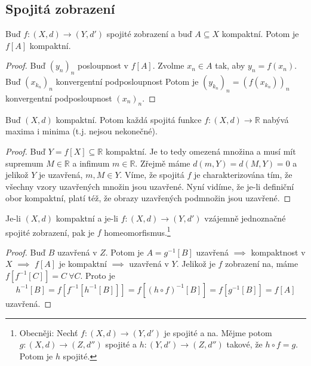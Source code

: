 \documentclass[../main.tex]{subfiles}
\begin{document}
\subsection{Spojitá zobrazení}

\begin{lemma}
	Buď $f: (X,d) \to (Y, d')$ spojité zobrazení a buď $A \subseteq X$ kompaktní. Potom je $f[A]$ kompaktní.
\end{lemma}

\begin{proof}
	Buď $(y_n)_n$ posloupnost v $f[A]$. Zvolme $x_n \in A$ tak, aby $y_n = f(x_n)$. Buď $(x_{k_n})_n$ konvergentní podposloupnost
	Potom je $(y_{k_n})_n = (f(x_{k_n}))_n$ konvergentní podposloupnost $(x_n)_n$.
\end{proof}

\begin{lemma}
	Buď $(X,d)$ kompaktní. Potom každá spojitá funkce $f:(X,d)\to \mathbb{R}$ nabývá maxima i minima (t.j. nejsou nekonečné).
\end{lemma}

\begin{proof}
	Buď $Y = f[X] \subseteq \mathbb{R}$ kompaktní. Je to tedy omezená množina a musí mít supremum $M\in \mathbb{R}$ a infimum $m\in \mathbb{R}$. Zřejmě máme 
	$d(m,Y) = d(M,Y) = 0$ a jelikož $Y$ je uzavřená, $m,M \in Y$. Víme, že spojitá $f$ je charakterizována tím, že všechny vzory uzavřených množin
	jsou uzavřené. Nyní vidíme, že je-li definiční obor kompaktní, platí též, že obrazy uzavřených podmnožin jsou uzavřené. 
\end{proof}


\begin{theorem}
	Je-li $(X,d)$ kompaktní a je-li $f: (X,d) \to (Y,d')$ vzájemně jednoznačné spojité zobrazení, pak je
	$f$ homeomorfismus.\footnote{
	Obecněji: Nechť $f:(X,d) \to (Y,d')$ je spojité a na. Mějme potom $g: (X,d) \to (Z, d'')$ spojité a
	$h: (Y,d') \to (Z,d'')$ takové, že $h \circ f = g$. Potom je $h$ spojité.}
\end{theorem}

\begin{proof}
	Buď $B$ uzavřená v $Z$. Potom je $A = g^{-1}[B]$ uzavřená $\implies$ kompaktnost v $X$ $\implies$ $f[A]$ je kompaktní $\implies$ uzavřená v $Y$. Jelikož  je $f$ zobrazení na, máme $f[f^{-1}[C]] = C\ \forall C$. Proto je 
	\[h^{-1}[B] = f[f^{-1}[h^{-1}[B]]] = f[(h \circ f)^{-1}[B]] = f[g^{-1}[B]] = f[A]\]
	uzavřená.
\end{proof}
\end{document}
